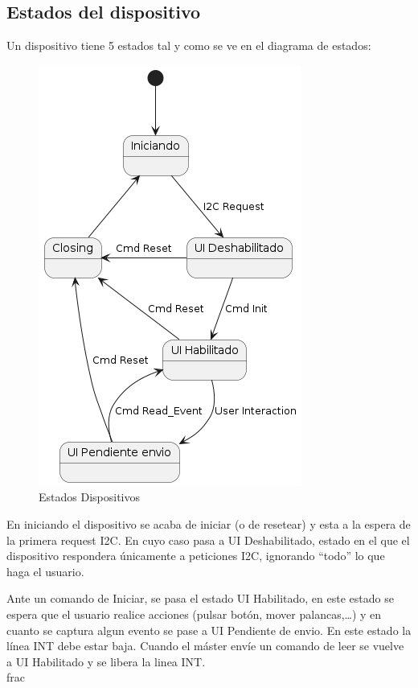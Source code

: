 \subsection{Estados del dispositivo}
Un dispositivo tiene 5 estados tal y como se ve en el diagrama de estados:
\begin{figure}[H]
    \centering{}
    \includegraphics[scale=0.8]{images/states.png}
    \caption{Estados Dispositivos}
    \label{fig:deviceStates}
\end{figure}
En iniciando el dispositivo se acaba de iniciar (o de resetear) y esta a la espera de la primera request I2C.
En cuyo caso pasa a UI Deshabilitado, estado en el que el dispositivo respondera únicamente a peticiones I2C,
ignorando “todo” lo que haga el usuario.

Ante un comando de Iniciar, se pasa el estado UI Habilitado, en este estado se espera que el usuario realice
acciones (pulsar botón, mover palancas,…) y en cuanto se captura algun evento se pase a UI Pendiente de envio.
En este estado la línea INT debe estar baja. Cuando el máster envíe un comando de leer se vuelve a UI Habilitado
y se libera la linea INT.\\frac{}{}

